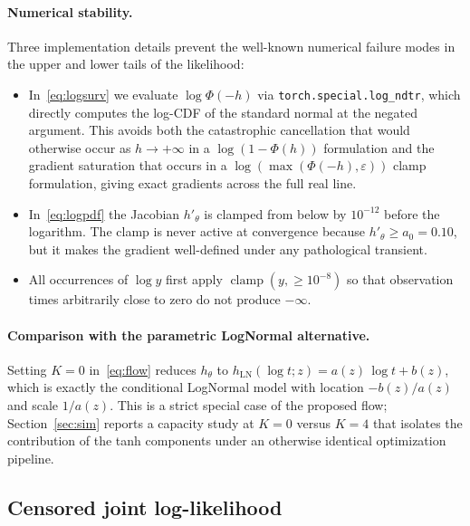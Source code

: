 \paragraph{Numerical stability.}
Three implementation details prevent the well-known numerical failure modes
in the upper and lower tails of the likelihood:
\begin{itemize}
    \item In~\eqref{eq:logsurv} we evaluate $\log \Phi(-h)$ via
          \texttt{torch.special.log\_ndtr}, which directly computes the
          log-CDF of the standard normal at the negated argument. This
          avoids both the catastrophic cancellation that would otherwise
          occur as $h \to +\infty$ in a $\log(1 - \Phi(h))$ formulation and
          the gradient saturation that occurs in a $\log(\max(\Phi(-h), \varepsilon))$
          clamp formulation, giving exact gradients across the full real
          line.
    \item In~\eqref{eq:logpdf} the Jacobian $h'_\theta$ is clamped from
          below by $10^{-12}$ before the logarithm. The clamp is never active
          at convergence because $h'_\theta \ge a_0 = 0.10$, but it makes
          the gradient well-defined under any pathological transient.
    \item All occurrences of $\log y$ first apply
          $\operatorname{clamp}(y, \ge 10^{-8})$ so that observation times
          arbitrarily close to zero do not produce $-\infty$.
\end{itemize}

\paragraph{Comparison with the parametric LogNormal alternative.}
Setting $K = 0$ in~\eqref{eq:flow} reduces $h_\theta$ to
$h_{\text{LN}}(\log t; z) = a(z)\,\log t + b(z)$, which is exactly the
conditional LogNormal model with location $-b(z)/a(z)$ and scale $1/a(z)$.
This is a strict special case of the proposed flow; Section~\ref{sec:sim}
reports a capacity study at $K = 0$ versus $K = 4$ that isolates the
contribution of the tanh components under an otherwise identical
optimization pipeline.

\subsection{Censored joint log-likelihood}
\label{sec:mle}

